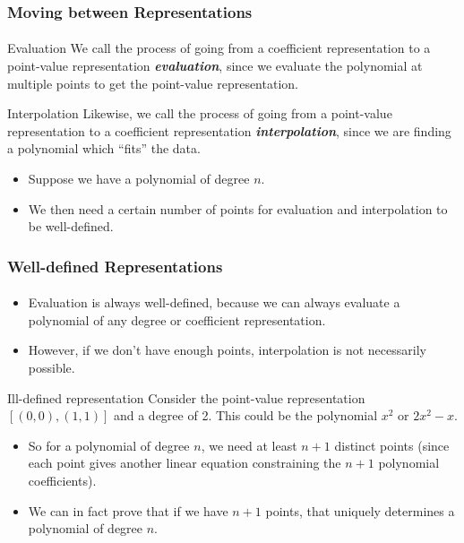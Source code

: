 \documentclass{beamer}                             %
\newcommand{\emphasis}[1]{\textbf{\textit{#1}}}
\begin{document}
\begin{frame}
\frametitle{Moving between Representations}
\framesubtitle{}
\begin{alertblock}{Evaluation}
  We call the process of going from
  a coefficient representation to a point-value representation
  \emphasis{evaluation}, since we evaluate the polynomial at multiple points
  to get the point-value representation.
\end{alertblock} \pause
\begin{alertblock}{Interpolation}
Likewise, we call the process of going from a point-value representation
to a coefficient representation \emphasis{interpolation}, since we are finding
a polynomial which \enquote{fits} the data. 
\end{alertblock} \pause
\begin{itemize}
  \item Suppose we have a polynomial of degree \( n \). 
  \item We then need a certain number of points for
    evaluation and interpolation to be well-defined.
\end{itemize}
\end{frame}

\begin{frame}
\frametitle{Well-defined Representations}
\framesubtitle{}
\begin{itemize}
  \item Evaluation is always well-defined, because we can always
    evaluate a polynomial of any degree or coefficient representation.
  \item However, if we don't have enough points,
    interpolation is not necessarily possible. \pause
\end{itemize}
\begin{exampleblock}{Ill-defined representation}
Consider the point-value representation \( [(0, 0), (1, 1)] \)
and a degree of 2. This could be the polynomial \( x^2 \) or \( 2x^2 - x \).
\end{exampleblock} \pause
\begin{itemize}
  \item So for a polynomial of degree \( n \), we need at least \( n + 1 \)
    distinct points (since each point gives another linear equation
    constraining the \( n + 1 \) polynomial coefficients).
  \item We can in fact prove that if we have \( n + 1 \) points,
    that uniquely determines a polynomial of degree \( n \).
\end{itemize}
\end{frame}
\end{document}
